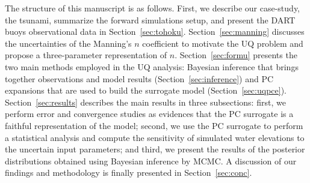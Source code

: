 The structure of this manuscript is as follows. First, we describe our case-study, the \tohoku tsunami,
summarize the forward simulations setup, and present the DART buoys observational data
in Section~\ref{sec:tohoku}. Section~\ref{sec:manning} discusses the uncertainties 
of the Manning's $n$ coefficient to motivate the UQ problem and propose a three-parameter representation of $n$. 
Section~\ref{sec:formu} presents the two main methods employed in the UQ analysis:
Bayesian inference that brings together observations 
and model results (Section~\ref{sec:inference}) 
and PC expansions that are used to build the surrogate model (Section~\ref{sec:uqpce}). Section~\ref{sec:results} describes the main results in 
three subsections: first, we perform error and convergence studies
as evidences that the PC surrogate is a faithful 
representation of the \geoclaw model; second, we use the PC surrogate to 
perform a statistical analysis and compute the  sensitivity of simulated water elevations
to the uncertain input parameters; and third, we present the results of the
posterior distributions obtained using Bayesian inference by MCMC. A discussion of our findings and methodology is finally presented in Section~\ref{sec:conc}.

